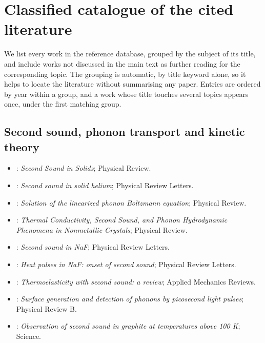 \section{Classified catalogue of the cited literature}\label{app:catalogue}
We list every work in the reference database, grouped by the subject of its title, and include works not discussed in the main text as further reading for the corresponding topic. The grouping is automatic, by title keyword alone, so it helps to locate the literature without summarising any paper. Entries are ordered by year within a group, and a work whose title touches several topics appears once, under the first matching group.
\subsection{Second sound, phonon transport and kinetic theory}
\begin{itemize}\itemsep0pt\small
\item \citet{Chester1963}: \emph{Second Sound in Solids}; Physical Review.
\item \citet{Ackerman1966}: \emph{Second sound in solid helium}; Physical Review Letters.
\item \citet{GuyerKrumhansl1966}: \emph{Solution of the linearized phonon Boltzmann equation}; Physical Review.
\item \citet{GuyerKrumhansl1966II}: \emph{Thermal Conductivity, Second Sound, and Phonon Hydrodynamic Phenomena in Nonmetallic Crystals}; Physical Review.
\item \citet{Jackson1970}: \emph{Second sound in NaF}; Physical Review Letters.
\item \citet{McNelly1970}: \emph{Heat pulses in NaF: onset of second sound}; Physical Review Letters.
\item \citet{Chandrasekharaiah1986}: \emph{Thermoelasticity with second sound: a review}; Applied Mechanics Reviews.
\item \citet{Thomsen1986}: \emph{Surface generation and detection of phonons by picosecond light pulses}; Physical Review B.
\item \citet{Huberman2019}: \emph{Observation of second sound in graphite at temperatures above 100 K}; Science.
\end{itemize}
